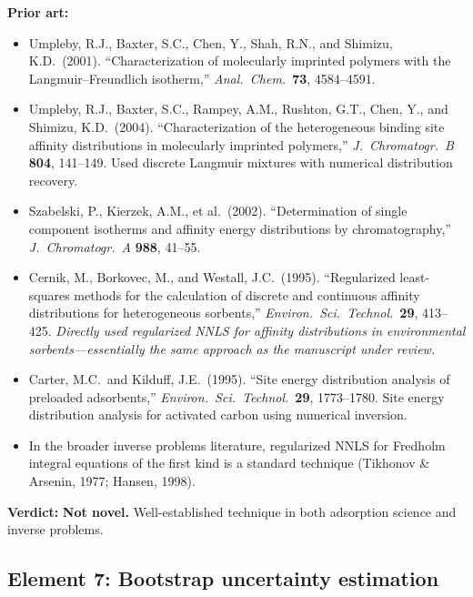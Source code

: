 \documentclass[12pt]{article}
\begin{document}
\textbf{Prior art:}
\begin{itemize}[nosep]
  \item Umpleby, R.J., Baxter, S.C., Chen, Y., Shah, R.N., and
        Shimizu, K.D.\ (2001). ``Characterization of molecularly imprinted
        polymers with the Langmuir--Freundlich isotherm,''
        \textit{Anal.\ Chem.}\ \textbf{73}, 4584--4591.
  \item Umpleby, R.J., Baxter, S.C., Rampey, A.M., Rushton, G.T.,
        Chen, Y., and Shimizu, K.D.\ (2004). ``Characterization of the
        heterogeneous binding site affinity distributions in molecularly
        imprinted polymers,'' \textit{J.\ Chromatogr.\ B} \textbf{804},
        141--149.  Used discrete Langmuir mixtures with numerical
        distribution recovery.
  \item Szabelski, P., Kierzek, A.M., et al.\ (2002).  ``Determination of
        single component isotherms and affinity energy distributions by
        chromatography,'' \textit{J.\ Chromatogr.\ A} \textbf{988}, 41--55.
  \item Cernik, M., Borkovec, M., and Westall, J.C.\ (1995).
        ``Regularized least-squares methods for the calculation of discrete
        and continuous affinity distributions for heterogeneous sorbents,''
        \textit{Environ.\ Sci.\ Technol.}\ \textbf{29}, 413--425.
        \emph{Directly used regularized NNLS for affinity distributions
        in environmental sorbents---essentially the same approach as the
        manuscript under review.}
  \item Carter, M.C.\ and Kilduff, J.E.\ (1995).
        ``Site energy distribution analysis of preloaded adsorbents,''
        \textit{Environ.\ Sci.\ Technol.}\ \textbf{29}, 1773--1780.
        Site energy distribution analysis for activated carbon using
        numerical inversion.
  \item In the broader inverse problems literature, regularized NNLS for
        Fredholm integral equations of the first kind is a standard
        technique (Tikhonov \& Arsenin, 1977; Hansen, 1998).
\end{itemize}

\textbf{Verdict:} \textbf{Not novel.}  Well-established technique in both
adsorption science and inverse problems.

\subsection{Element 7: Bootstrap uncertainty estimation}
\end{document}
